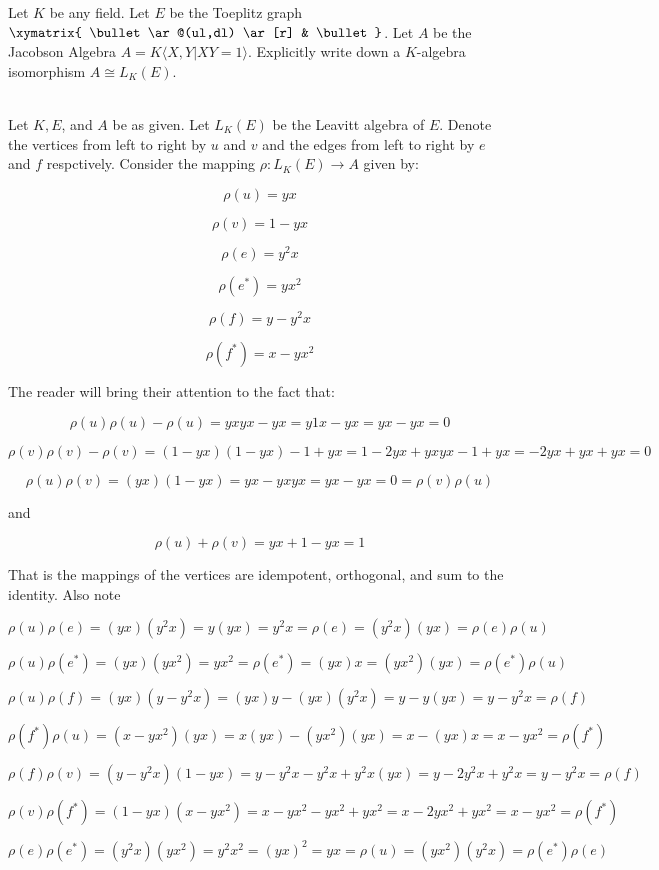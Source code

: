 Let $K$ be any field. Let $E$ be the Toeplitz graph  \ \ \
$\xymatrix{ \bullet \ar@(ul,dl)  \ar[r] & \bullet}$. Let $A$ be the Jacobson Algebra $A=K\langle X,Y|XY=1\rangle$.
Explicitly write down a $K$-algebra isomorphism $A\cong L_K(E)$.\\

\begin{solution}\renewcommand{\qedsymbol}{}\ \\
    Let $K, E$, and $A$ be as given. Let $L_K(E)$ be the Leavitt algebra of $E$. Denote the vertices
    from left to right by $u$ and $v$ and the edges from left to right by $e$ and $f$ respctively.
    Consider the mapping $\rho:L_K(E)\to A$ given by:

    $$\rho(u)=yx$$

    $$\rho(v)=1-yx$$

    $$\rho(e)=y^2x$$

    $$\rho(e^*)=yx^2$$

    $$\rho(f)=y-y^2x$$

    $$\rho(f^*)=x-yx^2$$

    The reader will bring their attention to the fact that:

    $$\rho(u)\rho(u)-\rho(u)=yxyx-yx=y1x-yx=yx-yx=0$$

    $$\rho(v)\rho(v)-\rho(v)=(1-yx)(1-yx)-1+yx=1-2yx+yxyx-1+yx=-2yx+yx+yx=0$$

    $$\rho(u)\rho(v)=(yx)(1-yx)=yx-yxyx=yx-yx=0=\rho(v)\rho(u)$$

    and

    $$\rho(u)+\rho(v)=yx+1-yx=1$$

    That is the mappings of the vertices are idempotent, orthogonal, and sum to the identity. Also note
    
    $$\rho(u)\rho(e)=(yx)(y^2x)=y(yx)=y^2x=\rho(e)=(y^2x)(yx)=\rho(e)\rho(u)$$

    $$\rho(u)\rho(e^*)=(yx)(yx^2)=yx^2=\rho(e^*)=(yx)x=(yx^2)(yx)=\rho(e^*)\rho(u)$$

    $$\rho(u)\rho(f)=(yx)(y-y^2x)=(yx)y-(yx)(y^2x)=y-y(yx)=y-y^2x=\rho(f)$$

    $$\rho(f^*)\rho(u)=(x-yx^2)(yx)=x(yx)-(yx^2)(yx)=x-(yx)x=x-yx^2=\rho(f^*)$$

    $$\rho(f)\rho(v)=(y-y^2x)(1-yx)=y-y^2x-y^2x+y^2x(yx)=y-2y^2x+y^2x=y-y^2x=\rho(f)$$

    $$\rho(v)\rho(f^*)=(1-yx)(x-yx^2)=x-yx^2-yx^2+yx^2=x-2yx^2+yx^2=x-yx^2=\rho(f^*)$$

    $$\rho(e)\rho(e^*)=(y^2x)(yx^2)=y^2x^2=(yx)^2=yx=\rho(u)=(yx^2)(y^2x)=\rho(e^*)\rho(e)$$


\end{solution}
